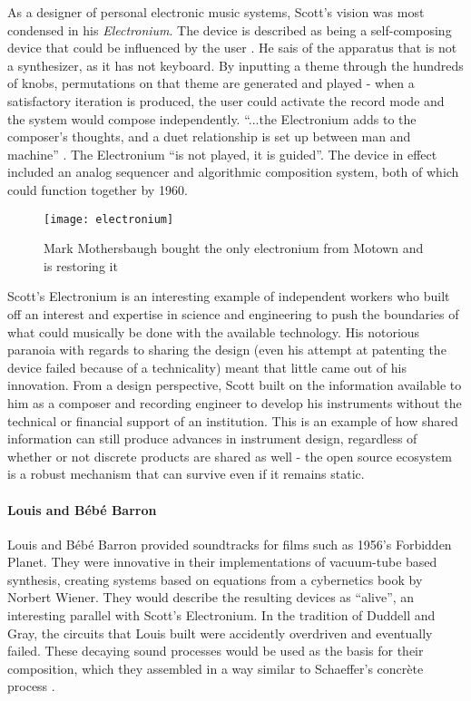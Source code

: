 \begin{itemize}
As a designer of personal electronic music systems, Scott's vision was most condensed in his \emph{Electronium}. The device is described as being a self-composing device that could be influenced by the user \citep[p.142]{holmes2002}. He sais of the apparatus that is not a synthesizer, as it has not keyboard. By inputting a theme through the hundreds of knobs, permutations on that theme are generated and played - when a satisfactory iteration is produced, the user could activate the record mode and the system would compose independently. ``...the Electronium adds to the composer's thoughts, and a duet relationship is set up between man and machine'' \citep{chusid1999}. The Electronium ``is not played, it is guided''\citep{darter1984}. The device in effect included an analog sequencer and algorithmic composition system, both of which could function together by 1960. 

	\begin{figure}[h!]
	  \caption{Mark Mothersbaugh bought the only electronium from Motown and is restoring it}
	  \centering
	    \texttt{[image: electronium]}
	\end{figure}
	
Scott's Electronium is an interesting example of independent workers who built off an interest and expertise in science and engineering to push the boundaries of what could musically be done with the available technology. His notorious paranoia with regards to sharing the design (even his attempt at patenting the device failed because of a technicality) meant that little came out of his innovation. From a design perspective, Scott built on the information available to him as a composer and recording engineer to develop his instruments without the technical or financial support of an institution. This is an example of how shared information can still produce advances in instrument design, regardless of whether or not discrete products are shared as well - the open source ecosystem is a robust mechanism that can survive even if it remains static. 

\paragraph{Louis and Bébé Barron}

Louis and Bébé Barron provided soundtracks for films such as 1956’s Forbidden Planet. They were innovative in their implementations of vacuum-tube based synthesis, creating systems based on equations from a cybernetics book by Norbert Wiener. They would describe the resulting devices as ``alive'', an interesting parallel with Scott’s Electronium. In the tradition of Duddell and Gray, the circuits that Louis built were accidently overdriven and eventually failed. These decaying sound processes would be used as the basis for their composition, which they assembled in a way similar to Schaeffer’s concrète process \citep{dunbar2010}.


\end{itemize}
